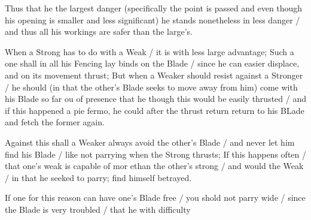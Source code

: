 Thus that he the largest danger (specifically the point is passed and
even though his opening is smaller and less significant) he stands
nonetheless in less danger / and thus all his workings are safer than
the large's.

When a Strong has to do with a Weak / it is with less large advantage;
Such a one shall in all his Fencing lay binds on the Blade / since he
can easier displace, and on its movement thrust; But when a Weaker
should resist against a Stronger / he should (in that the other's Blade
seeks to move away from him) come with his Blade so far ou of presence
that he though this would be easily thrusted / and if this happened a
pie fermo, he could after the thrust return return to his BLade and
fetch the former again.

Against this shall a Weaker always avoid the other's Blade / and never
let him find his Blade / like not parrying when the Strong thrusts; If
this happens often / that one's weak is capable of mor ethan the
other's strong / and would the Weak / in that he seeked to parry; find
himself betrayed.


If one for this reason can have one's Blade free / you shold not parry
wide / since the Blade is very troubled / that he with difficulty